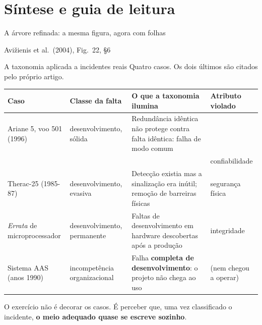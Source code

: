 \documentclass{beamer}
\newcommand{\sect}[1]{\par\smallskip\hfill{\tiny\color{black!55}Avi\v{z}ienis et al.\ (2004), #1}}
\begin{document}
\section{S\'intese e guia de leitura}

\begin{frame}{A \'arvore refinada: a mesma figura, agora com folhas}
    \centering
    \diagArvoreRefinada
    \sect{Fig.\ 22, \S6}
\end{frame}

\begin{frame}{A taxonomia aplicada a incidentes reais}
    \scriptsize
    Quatro casos. Os dois \'ultimos s\~ao citados pelo pr\'oprio artigo.
    \medskip
    \begin{tabularx}{\linewidth}{@{}p{2.0cm} p{1.9cm} >{\raggedright\arraybackslash}X p{2.0cm}@{}}
        \toprule
        \textbf{Caso} & \textbf{Classe da falta} & \textbf{O que a taxonomia ilumina} & \textbf{Atributo violado} \\
        \midrule
        \rowcolor{depVermelho!7} Ariane 5, voo 501 (1996) & desenvolvimento, s\'olida & Redund\^ancia id\^entica n\~ao protege contra falta id\^entica: falha de modo comum \\
        \rowcolor{depVermelho!7} & & & confiabilidade \\
        \rowcolor{depLaranja!8} Therac-25 (1985-87) & desenvolvimento, evasiva & Detec\c{c}\~ao existia mas a sinaliza\c{c}\~ao era in\'util; remo\c{c}\~ao de barreiras f\'isicas & seguran\c{c}a f\'isica \\
        \rowcolor{depAzul!7} \textit{Errata} de microprocessador & desenvolvimento, permanente & Faltas de desenvolvimento em hardware descobertas ap\'os a produ\c{c}\~ao & integridade \\
        \rowcolor{depVerde!7} Sistema AAS (anos 1990) & incompet\^encia organizacional & Falha \textbf{completa de desenvolvimento}: o projeto n\~ao chega ao uso & (nem chegou a operar) \\
        \bottomrule
    \end{tabularx}
    \smallskip
    \begin{ancora}
        \scriptsize
        O exerc\'icio n\~ao \'e decorar os casos. \'E perceber que, uma vez classificado o incidente, \textbf{o meio adequado quase se escreve sozinho}.
    \end{ancora}
\end{frame}
\end{document}
